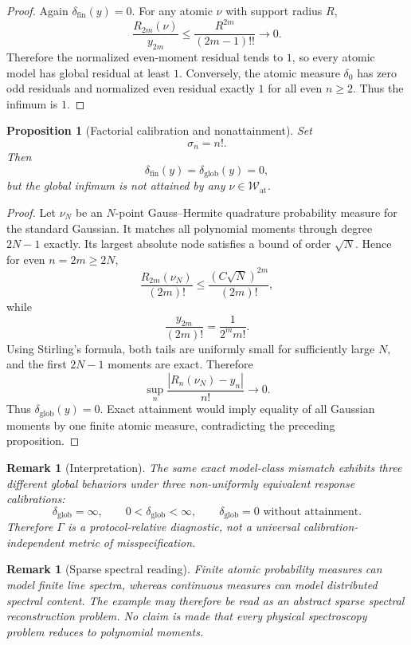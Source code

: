 \documentclass[11pt]{article}
\newtheorem{proposition}[definition]{Proposition}
\newtheorem{remark}[definition]{Remark}
\newcommand{\W}{\mathcal W}
\begin{document}
\begin{proof}
Again $\delta_{\mathrm{fin}}(y)=0$. For any atomic $\nu$ with support radius
$R$,
\[
\frac{R_{2m}(\nu)}{y_{2m}}
\le
\frac{R^{2m}}{(2m-1)!!}
\to0.
\]
Therefore the normalized even-moment residual tends to $1$, so every atomic
model has global residual at least $1$. Conversely, the atomic measure
$\delta_0$ has zero odd residuals and normalized even residual exactly $1$ for
all even $n\ge2$. Thus the infimum is $1$.
\end{proof}

\begin{proposition}[Factorial calibration and nonattainment]
Set
\[
\sigma_n=n!.
\]
Then
\[
\delta_{\mathrm{fin}}(y)
=
\delta_{\mathrm{glob}}(y)
=
0,
\]
but the global infimum is not attained by any
$\nu\in\W_{\mathrm{at}}$.
\end{proposition}

\begin{proof}
Let $\nu_N$ be an $N$-point Gauss--Hermite quadrature probability measure for
the standard Gaussian. It matches all polynomial moments through degree
$2N-1$ exactly. Its largest absolute node satisfies a bound of order
$\sqrt N$. Hence for even $n=2m\ge2N$,
\[
\frac{R_{2m}(\nu_N)}{(2m)!}
\le
\frac{(C\sqrt N)^{2m}}{(2m)!},
\]
while
\[
\frac{y_{2m}}{(2m)!}
=
\frac{1}{2^m m!}.
\]
Using Stirling's formula, both tails are uniformly small for sufficiently large
$N$, and the first $2N-1$ moments are exact. Therefore
\[
\sup_n\frac{|R_n(\nu_N)-y_n|}{n!}\to0.
\]
Thus $\delta_{\mathrm{glob}}(y)=0$. Exact attainment would imply equality of
all Gaussian moments by one finite atomic measure, contradicting the preceding
proposition.
\end{proof}

\begin{remark}[Interpretation]
The same exact model-class mismatch exhibits three different global behaviors
under three non-uniformly equivalent response calibrations:
\[
\delta_{\mathrm{glob}}=\infty,
\qquad
0<\delta_{\mathrm{glob}}<\infty,
\qquad
\delta_{\mathrm{glob}}=0\text{ without attainment}.
\]
Therefore $\Gamma$ is a protocol-relative diagnostic, not a universal
calibration-independent metric of misspecification.
\end{remark}

\begin{remark}[Sparse spectral reading]
Finite atomic probability measures can model finite line spectra, whereas
continuous measures can model distributed spectral content. The example may
therefore be read as an abstract sparse spectral reconstruction problem. No
claim is made that every physical spectroscopy problem reduces to polynomial
moments.
\end{remark}
\end{document}
